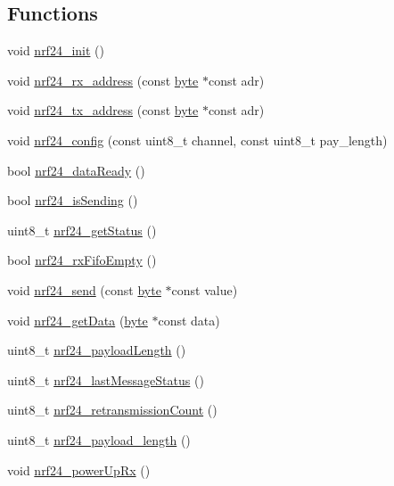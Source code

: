 \subsection*{Functions}
\begin{DoxyCompactItemize}
\item 
void \hyperlink{a00013_a74436d4829a431fcd9b5ef6ff76d0677}{nrf24\-\_\-init} ()
\item 
void \hyperlink{a00013_a828f90ed30594cc2c29272ce3a0345db}{nrf24\-\_\-rx\-\_\-address} (const \hyperlink{a00011_a82b52bf2b45e214a8f2100ebfdf1aee4}{byte} $\ast$const adr)
\item 
void \hyperlink{a00013_a17831f7445d7a64fc5f993cb8661ccaa}{nrf24\-\_\-tx\-\_\-address} (const \hyperlink{a00011_a82b52bf2b45e214a8f2100ebfdf1aee4}{byte} $\ast$const adr)
\item 
void \hyperlink{a00013_a97793f0c66a9d83e7180e54b6054e366}{nrf24\-\_\-config} (const uint8\-\_\-t channel, const uint8\-\_\-t pay\-\_\-length)
\item 
bool \hyperlink{a00013_a712c0b5e8c339da2e8f36cfbba8892ac}{nrf24\-\_\-data\-Ready} ()
\item 
bool \hyperlink{a00013_a126be099971800e98c2c0b0fa6910051}{nrf24\-\_\-is\-Sending} ()
\item 
uint8\-\_\-t \hyperlink{a00013_ab1cbb7a5d39d2d1389156e88d10ff85b}{nrf24\-\_\-get\-Status} ()
\item 
bool \hyperlink{a00013_a9e05723f5fa753cfb2ea219e90eb3c2b}{nrf24\-\_\-rx\-Fifo\-Empty} ()
\item 
void \hyperlink{a00013_ae806a152ba1c40a6c7a62cfbb7b23a64}{nrf24\-\_\-send} (const \hyperlink{a00011_a82b52bf2b45e214a8f2100ebfdf1aee4}{byte} $\ast$const value)
\item 
void \hyperlink{a00013_a195d164f0c500d345d23ca1dfa3fa0d1}{nrf24\-\_\-get\-Data} (\hyperlink{a00011_a82b52bf2b45e214a8f2100ebfdf1aee4}{byte} $\ast$const data)
\item 
uint8\-\_\-t \hyperlink{a00013_a62aedbae7c08c9e560c6e95466067fce}{nrf24\-\_\-payload\-Length} ()
\item 
uint8\-\_\-t \hyperlink{a00013_a887f428c44dc2efda8a9f701dee6ec34}{nrf24\-\_\-last\-Message\-Status} ()
\item 
uint8\-\_\-t \hyperlink{a00013_ae0f50a459cd34957291713bb002893f8}{nrf24\-\_\-retransmission\-Count} ()
\item 
uint8\-\_\-t \hyperlink{a00013_a2cf62b6425bac2d6f51355a6cf4fe61e}{nrf24\-\_\-payload\-\_\-length} ()
\item 
void \hyperlink{a00013_a5e2122f30566907a73d39598ba99ef08}{nrf24\-\_\-power\-Up\-Rx} ()

\end{DoxyCompactItemize}
